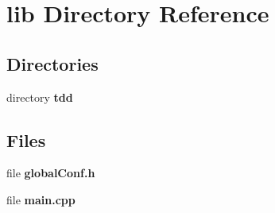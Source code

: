 \section{lib Directory Reference}
\label{dir_97aefd0d527b934f1d99a682da8fe6a9}
\subsection*{Directories}
\begin{DoxyCompactItemize}
\item 
directory {\bf tdd}
\end{DoxyCompactItemize}
\subsection*{Files}
\begin{DoxyCompactItemize}
\item 
file {\bfseries global\+Conf.\+h}
\item 
file {\bf main.\+cpp}
\end{DoxyCompactItemize}
